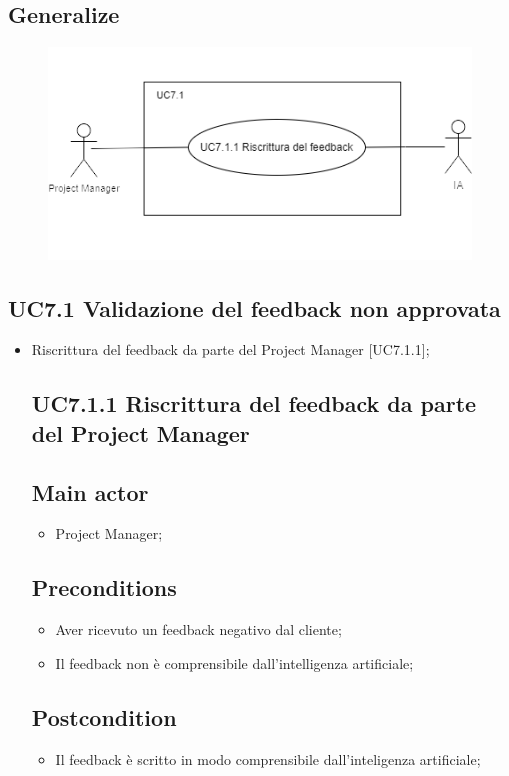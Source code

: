 \documentclass{article}
\begin{document}
    \subsection*{Generalize}
      \begin{figure}[h]
            \centering
            \includegraphics{./imgUML/UC7-zoom1.png}
            \label{fig:immagine}
        \end{figure}
    \subsection{UC7.1 Validazione del feedback non approvata}
    \begin{itemize}
        \item Riscrittura del feedback da parte del Project Manager [UC7.1.1];
        \subsection*{UC7.1.1 Riscrittura del feedback da parte del Project Manager}
     \subsection*{Main actor}
         \begin{itemize}
             \item Project Manager;
         \end{itemize}
     \subsection*{Preconditions} 
        \begin{itemize}
            \item Aver ricevuto un feedback negativo dal cliente;
            \item Il feedback non è comprensibile dall'intelligenza artificiale;
        \end{itemize}
        \subsection*{Postcondition} 
        \begin{itemize}
            \item Il feedback è scritto in modo comprensibile dall'inteligenza artificiale;
        \end{itemize}
    \end{itemize}
    
\end{document}
